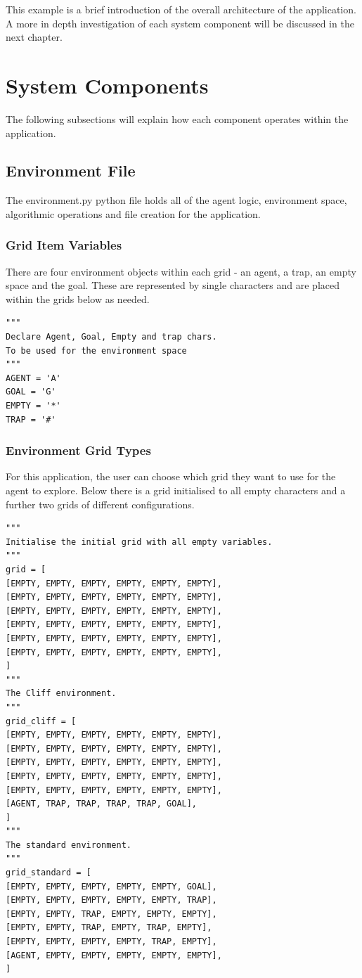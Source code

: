 This example is a brief introduction of the overall architecture of the application. A more in depth investigation of each system component will be discussed in the next chapter.

\section{System Components}
The following subsections will explain how each component operates within the application.

\subsection{Environment File}
The environment.py python file holds all of the agent logic, environment space, algorithmic operations and file creation for the application.

\subsubsection{Grid Item Variables}
There are four environment objects within each grid - an agent, a trap, an empty space and the goal.
These are represented by single characters and are placed within the grids below as needed.
\begin{verbatim}
"""
Declare Agent, Goal, Empty and trap chars.
To be used for the environment space
"""
AGENT = 'A'
GOAL = 'G'
EMPTY = '*'
TRAP = '#'
\end{verbatim}
\subsubsection{Environment Grid Types}
For this application, the user can choose which grid they want to use for the agent to explore.
Below there is a grid initialised to all empty characters and a further two grids of different configurations.
\begin{verbatim}
"""
Initialise the initial grid with all empty variables.
"""
grid = [
[EMPTY, EMPTY, EMPTY, EMPTY, EMPTY, EMPTY],
[EMPTY, EMPTY, EMPTY, EMPTY, EMPTY, EMPTY],
[EMPTY, EMPTY, EMPTY, EMPTY, EMPTY, EMPTY],
[EMPTY, EMPTY, EMPTY, EMPTY, EMPTY, EMPTY],
[EMPTY, EMPTY, EMPTY, EMPTY, EMPTY, EMPTY],
[EMPTY, EMPTY, EMPTY, EMPTY, EMPTY, EMPTY],
]
"""
The Cliff environment.
"""
grid_cliff = [
[EMPTY, EMPTY, EMPTY, EMPTY, EMPTY, EMPTY],
[EMPTY, EMPTY, EMPTY, EMPTY, EMPTY, EMPTY],
[EMPTY, EMPTY, EMPTY, EMPTY, EMPTY, EMPTY],
[EMPTY, EMPTY, EMPTY, EMPTY, EMPTY, EMPTY],
[EMPTY, EMPTY, EMPTY, EMPTY, EMPTY, EMPTY],
[AGENT, TRAP, TRAP, TRAP, TRAP, GOAL],
]
"""
The standard environment.
"""
grid_standard = [
[EMPTY, EMPTY, EMPTY, EMPTY, EMPTY, GOAL],
[EMPTY, EMPTY, EMPTY, EMPTY, EMPTY, TRAP],
[EMPTY, EMPTY, TRAP, EMPTY, EMPTY, EMPTY],
[EMPTY, EMPTY, TRAP, EMPTY, TRAP, EMPTY],
[EMPTY, EMPTY, EMPTY, EMPTY, TRAP, EMPTY],
[AGENT, EMPTY, EMPTY, EMPTY, EMPTY, EMPTY],
]
\end{verbatim}

